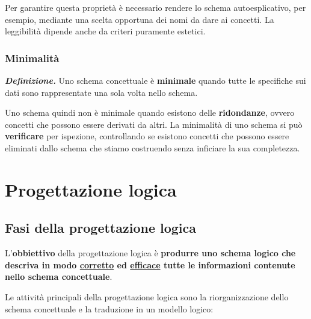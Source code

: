 \documentclass[a4paper]{article}
\begin{document}
	\noindent
	Per garantire questa proprietà è necessario rendere lo schema autoesplicativo, \textcolor{Green4}{per esempio}, mediante una scelta opportuna dei nomi da dare ai concetti. La leggibilità dipende anche da criteri puramente estetici.
	
	\subsubsection{Minimalità}\label{par: minimalità}
	
	\textcolor{Red3}{\textbf{\emph{Definizione.}}} Uno schema concettuale è \textbf{minimale} quando tutte le specifiche sui dati sono rappresentate una sola volta nello schema.\newline
	
	\noindent
	Uno schema quindi non è minimale quando esistono delle \textbf{ridondanze}, ovvero concetti che possono essere derivati da altri. La minimalità di uno schema si può \textbf{verificare} per ispezione, controllando se esistono concetti che possono essere eliminati dallo schema che stiamo costruendo senza inficiare la sua completezza.
	
	\newpage
	
	\section{Progettazione logica}
	
	\subsection{Fasi della progettazione logica}
	
	L'\textcolor{Red3}{\textbf{obbiettivo}} della progettazione logica è \textbf{produrre uno schema logico che descriva in modo \underline{corretto} ed \underline{efficace} tutte le informazioni contenute nello schema concettuale}.
	
	Le attività principali della progettazione logica sono la riorganizzazione dello schema concettuale e la traduzione in un modello logico:
	
\end{document}
